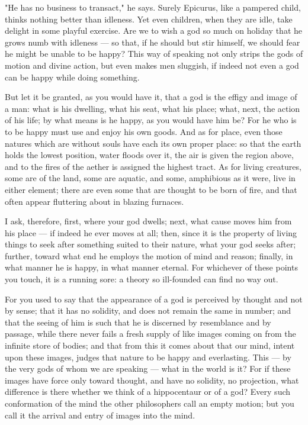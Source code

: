  "He has no business to transact," he says. Surely Epicurus, like a pampered child, thinks nothing better than idleness. Yet even children, when they are idle, take delight in some playful exercise. Are we to wish a god so much on holiday that he grows numb with idleness — so that, if he should but stir himself, we should fear he might be unable to be happy? This way of speaking not only strips the gods of motion and divine action, but even makes men sluggish, if indeed not even a god can be happy while doing something.

 But let it be granted, as you would have it, that a god is the effigy and image of a man: what is his dwelling, what his seat, what his place; what, next, the action of his life; by what means is he happy, as you would have him be? For he who is to be happy must use and enjoy his own goods. And as for place, even those natures which are without souls have each its own proper place: so that the earth holds the lowest position, water floods over it, the air is given the region above, and to the fires of the aether is assigned the highest tract. As for living creatures, some are of the land, some are aquatic, and some, amphibious as it were, live in either element; there are even some that are thought to be born of fire, and that often appear fluttering about in blazing furnaces.

 I ask, therefore, first, where your god dwells; next, what cause moves him from his place — if indeed he ever moves at all; then, since it is the property of living things to seek after something suited to their nature, what your god seeks after; further, toward what end he employs the motion of mind and reason; finally, in what manner he is happy, in what manner eternal. For whichever of these points you touch, it is a running sore: a theory so ill-founded can find no way out.

 For you used to say that the appearance of a god is perceived by thought and not by sense; that it has no solidity, and does not remain the same in number; and that the seeing of him is such that he is discerned by resemblance and by passage, while there never fails a fresh supply of like images coming on from the infinite store of bodies; and that from this it comes about that our mind, intent upon these images, judges that nature to be happy and everlasting. This — by the very gods of whom we are speaking — what in the world is it? For if these images have force only toward thought, and have no solidity, no projection, what difference is there whether we think of a hippocentaur or of a god? Every such conformation of the mind the other philosophers call an empty motion; but you call it the arrival and entry of images into the mind.

